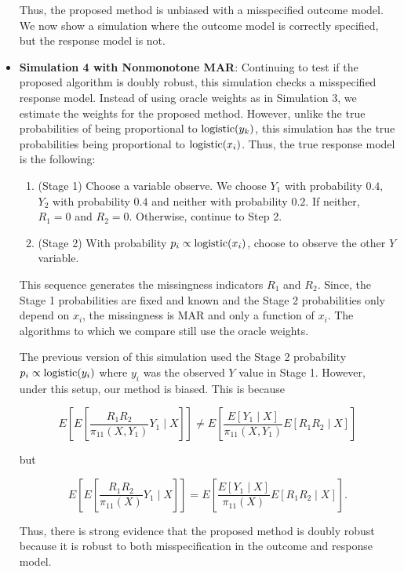 \begin{itemize}
    Thus, the proposed method is unbiased with a misspecified outcome model.
    We now show a simulation where the outcome model is correctly specified, but
    the response model is not.

  \item \textbf{Simulation 4 with Nonmonotone MAR}:
    Continuing to test if the proposed algorithm is doubly robust, this
    simulation checks a misspecified response model. Instead of using oracle
    weights as in Simulation 3, we estimate the weights for the proposed method.
    However, unlike the true probabilities of being proportional to
    ${\text{logistic}}(y_k)$, this simulation has the true probabilities being
    proportional to ${\text{logistic}}(x_i)$. Thus, the true response model is the
    following:

    \begin{enumerate}
      \item (Stage 1) Choose a variable observe. We choose $Y_1$ with
        probability $0.4$, $Y_2$ with probability $0.4$ and neither with
        probability $0.2$. If neither, $R_1 = 0$ and $R_2 = 0$. Otherwise,
        continue to Step 2.
      \item (Stage 2) With probability $p_i \propto {\text{logistic}}(x_i)$, choose to
        observe the other $Y$ variable. 
    \end{enumerate}

    This sequence generates the missingness indicators $R_1$ and $R_2$. Since,
    the Stage 1 probabilities are fixed and known and the Stage 2 probabilities
    only depend on $x_i$, the missingness is MAR and only a function of $x_i$.
    The algorithms to which we compare still use the oracle weights.

    
    
    

    The previous version of this simulation used the Stage 2 probability $p_i
    \propto {\text{logistic}}(y_i)$ where $y_i$ was the observed $Y$ value in Stage 1.
    However, under this setup, our method is biased. This is because

    \[ E\left[E\left[\frac{R_1 R_2}{\pi_{11}(X, Y_1)} Y_1 \mid X\right]\right] 
    \neq
    E\left[\frac{E[Y_1 \mid X]}{\pi_{11}(X, Y_1)} E[R_1 R_2 \mid X]\right] \]

    but

    \[ E\left[E\left[\frac{R_1 R_2}{\pi_{11}(X)} Y_1 \mid X\right]\right] 
    =
    E\left[\frac{E[Y_1 \mid X]}{\pi_{11}(X)} E[R_1 R_2 \mid X]\right].\]

    Thus, there is strong evidence that the proposed method is 
    doubly robust because it is robust to both misspecification in the outcome
    and response model.
\end{itemize}

\newpage
